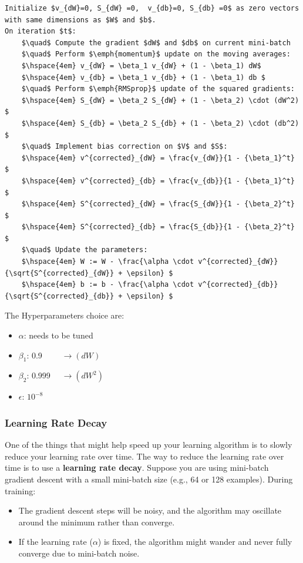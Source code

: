 \documentclass[letterpaper,12pt,notitlepage,twoside]{report}
\begin{document}
\begin{lstlisting}
Initialize $v_{dW}=0, S_{dW} =0,  v_{db}=0, S_{db} =0$ as zero vectors with same dimensions as $W$ and $b$.
On iteration $t$: 
	$\quad$ Compute the gradient $dW$ and $db$ on current mini-batch
	$\quad$ Perform $\emph{momentum}$ update on the moving averages:
	$\hspace{4em} v_{dW} = \beta_1 v_{dW} + (1 - \beta_1) dW$
	$\hspace{4em} v_{db} = \beta_1 v_{db} + (1 - \beta_1) db $
	$\quad$ Perform $\emph{RMSprop}$ update of the squared gradients:
	$\hspace{4em} S_{dW} = \beta_2 S_{dW} + (1 - \beta_2) \cdot (dW^2) $
	$\hspace{4em} S_{db} = \beta_2 S_{db} + (1 - \beta_2) \cdot (db^2) $
	$\quad$ Implement bias correction on $V$ and $S$:
	$\hspace{4em} v^{corrected}_{dW} = \frac{v_{dW}}{1 - {\beta_1}^t} $
	$\hspace{4em} v^{corrected}_{db} = \frac{v_{db}}{1 - {\beta_1}^t} $
	$\hspace{4em} S^{corrected}_{dW} = \frac{S_{dW}}{1 - {\beta_2}^t} $
	$\hspace{4em} S^{corrected}_{db} = \frac{S_{db}}{1 - {\beta_2}^t} $
	$\quad$ Update the parameters:
	$\hspace{4em} W := W - \frac{\alpha \cdot v^{corrected}_{dW}}{\sqrt{S^{corrected}_{dW}} + \epsilon} $
	$\hspace{4em} b := b - \frac{\alpha \cdot v^{corrected}_{db}}{\sqrt{S^{corrected}_{db}} + \epsilon} $	
\end{lstlisting}

The Hyperparameters choice are:
\begin{itemize}[label={}]
	\item \(\alpha\): needs to be tuned
	\item \(\beta_1\): 0.9 \(\qquad \longrightarrow (dW)\)
	\item \(\beta_2\): 0.999 \(\quad \longrightarrow (dW^2)\)
	\item \(\epsilon\): \(10^{-8}\)
\end{itemize}

\subsubsection{Learning Rate Decay}
One of the things that might help speed up your learning algorithm is to slowly reduce your learning rate over time. The way to reduce the learning rate over time is to use a \textbf{learning rate decay}.  Suppose you are using mini-batch gradient descent with a small mini-batch size (e.g., 64 or 128 examples). During training:
\begin{itemize}[noitemsep, topsep=0pt]
    \item The gradient descent steps will be noisy, and the algorithm may oscillate around the minimum rather than converge.
    \item If the learning rate (\( \alpha \)) is fixed, the algorithm might wander and never fully converge due to mini-batch noise.
\end{itemize}
\end{document}
